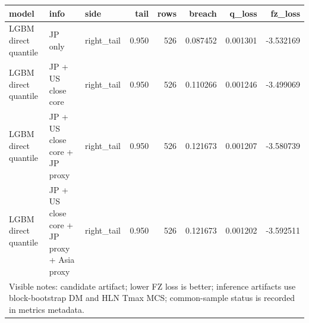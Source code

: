 \begin{tabular}{lllrrrrr}
\toprule
model & info & side & tail & rows & breach & q_loss & fz_loss \\
\midrule
LGBM direct quantile & JP only & right\_tail & 0.950 & 526 & 0.087452 & 0.001301 & -3.532169 \\
LGBM direct quantile & JP + US close core & right\_tail & 0.950 & 526 & 0.110266 & 0.001246 & -3.499069 \\
LGBM direct quantile & JP + US close core + JP proxy & right\_tail & 0.950 & 526 & 0.121673 & 0.001207 & -3.580739 \\
LGBM direct quantile & JP + US close core + JP proxy + Asia proxy & right\_tail & 0.950 & 526 & 0.121673 & 0.001202 & -3.592511 \\
\midrule
\multicolumn{8}{l}{\footnotesize Visible notes: candidate artifact; lower FZ loss is better; inference artifacts use block-bootstrap DM and HLN Tmax MCS; common-sample status is recorded in metrics metadata.} \\
\bottomrule
\end{tabular}
